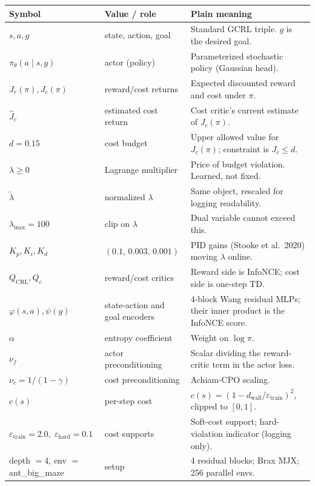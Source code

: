 \documentclass[11pt]{article}
\newcommand{\Jr}{J_{r}}
\newcommand{\Jc}{J_{c}}
\newcommand{\Jhatc}{\widehat{J}_{c}}
\newcommand{\Qc}{Q_{c}}
\newcommand{\QCRL}{Q_{\mathrm{CRL}}}
\newcommand{\lamt}{\tilde{\lambda}}
\newcommand{\eps}{\varepsilon}
\begin{document}
\begin{center}
\small
\renewcommand{\arraystretch}{1.15}
\begin{tabular}{@{}l l p{9.2cm}@{}}
\toprule
Symbol & Value / role & Plain meaning \\
\midrule
$s,a,g$              & state, action, goal             & Standard GCRL triple. $g$ is the desired goal. \\
$\pi_\theta(a\mid s,g)$ & actor (policy)               & Parameterized stochastic policy (Gaussian head). \\
$\Jr(\pi),\Jc(\pi)$  & reward/cost returns             & Expected discounted reward and cost under $\pi$. \\
$\Jhatc$             & estimated cost return           & Cost critic's current estimate of $\Jc(\pi)$. \\
$d=0.15$             & cost budget                     & Upper allowed value for $\Jc(\pi)$; constraint is $\Jc\le d$. \\
$\lambda\ge 0$       & Lagrange multiplier             & Price of budget violation. Learned, not fixed. \\
$\lamt$              & normalized $\lambda$            & Same object, rescaled for logging readability. \\
$\lambda_{\max}=100$ & clip on $\lambda$               & Dual variable cannot exceed this. \\
$K_p,K_i,K_d$        & $(0.1,\,0.003,\,0.001)$         & PID gains (Stooke et al.\ 2020) moving $\lambda$ online. \\
$\QCRL,\Qc$          & reward/cost critics             & Reward side is InfoNCE; cost side is one-step TD. \\
$\varphi(s,a),\psi(g)$ & state-action and goal encoders& 4-block Wang residual MLPs; their inner product is the InfoNCE score. \\
$\alpha$             & entropy coefficient             & Weight on $\log\pi$. \\
$\nu_f$              & actor preconditioning           & Scalar dividing the reward-critic term in the actor loss. \\
$\nu_c=1/(1-\gamma)$ & cost preconditioning            & Achiam-CPO scaling. \\
$c(s)$               & per-step cost                   & $c(s)=(1-d_{\text{wall}}/\eps_{\text{train}})^2$, clipped to $[0,1]$. \\
$\eps_{\text{train}}=2.0,\;\eps_{\text{hard}}=0.1$ & cost supports & Soft-cost support; hard-violation indicator (logging only). \\
depth $=4$, env $=$ ant\_big\_maze & setup            & 4 residual blocks; Brax MJX; 256 parallel envs. \\
\bottomrule
\end{tabular}
\end{center}
\end{document}
